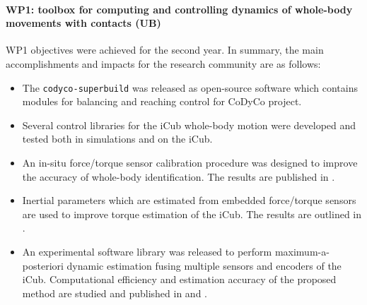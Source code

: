 

\paragraph*{WP1: toolbox for computing and controlling dynamics of whole-body
  movements with contacts (UB)}

WP1 objectives were achieved for the second year.  In summary, the main
accomplishments and impacts for the research community are as follows:

\begin{itemize}

\item The \texttt{codyco-superbuild} was released as open-source software
  which contains modules for balancing and reaching control for CoDyCo
  project.

\item Several control libraries for the iCub whole-body motion were developed
  and tested both in simulations and on the iCub.

\item An in-situ force/torque sensor calibration procedure was designed to
  improve the accuracy of whole-body identification.  The results are
  published in \cite{Traversaro2015b}.

\item Inertial parameters which are estimated from embedded force/torque
  sensors are used to improve torque estimation of the iCub.  The results are
  outlined in \cite{Traversaro2015}.

\item An experimental software library was released to perform
  maximum-a-posteriori dynamic estimation fusing multiple sensors and encoders
  of the iCub.  Computational efficiency and estimation accuracy of the
  proposed method are studied and published in \cite{Nori2015} and
  \cite{Nori2015b}.
 
 \end{itemize}


